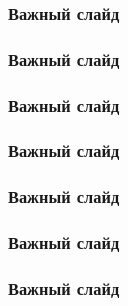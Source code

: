 \documentclass[8pt]{bmstu-pr}
\begin{document}
\begin{frame}
    \frametitle{Важный слайд}



\end{frame}


\begin{frame}
    \frametitle{Важный слайд}

\end{frame}

\begin{frame}
    \frametitle{Важный слайд}
\end{frame}

\begin{frame}
    \frametitle{Важный слайд}
\end{frame}

\begin{frame}
    \frametitle{Важный слайд}
\end{frame}

\begin{frame}
    \frametitle{Важный слайд}
\end{frame}


\begin{frame}
    \frametitle{Важный слайд}

\end{frame}
\end{document}
